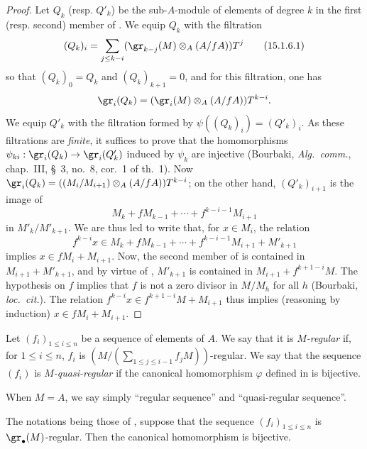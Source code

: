 \begin{proof}
Let $Q_k$ (resp. $Q'_k$) be the sub-$A$-module of elements of degree $k$ in the first (resp. second) member of .
We equip $Q_k$ with the filtration
\[
\label{0.15.1.6.1}
  (Q_k)_i = \sum_{j\leq k-i} (\gr_{k-j}(M)\otimes_A(A/fA))T^j
\tag{15.1.6.1}
\]
so that $(Q_k)_0=Q_k$ and $(Q_k)_{k+1}=0$, and for this filtration, one has
\[
  \gr_i(Q_k) = (\gr_i(M)\otimes_A(A/fA))T^{k-i}.
\]
We equip $Q'_k$ with the filtration formed by $\psi((Q_k)_i)=(Q'_k)_i$.
As these filtrations are \emph{finite}, it suffices to prove that the homomorphisms $\psi_{ki}:\gr_i(Q_k)\to\gr_i(Q'_k)$ induced by $\psi_k$ are injective
(Bourbaki, \emph{Alg.~comm.}, chap.~III, \S~3, no.~8, cor.~1 of th.~1).
Now $\gr_i(Q_k)=((M_i/M_{i+1})\otimes_A(A/fA))T^{k-i}$;
on the other hand, $(Q'_k)_{i+1}$ is the image of
\[
  M_k+fM_{k-1}+\cdots+f^{k-i-1}M_{i+1}
\]
in $M'_k/M'_{k+1}$.
We are thus led to write that, for $x\in M_i$, the relation
\[
\label{0.15.1.6.2}
  f^{k-i}x\in M_k+fM_{k-1}+\cdots+f^{k-i-1}M_{i+1}+M'_{k+1}
\tag{15.1.6.2}
\]
implies $x\in fM_i+M_{i+1}$.
Now, the second member of  is contained in $M_{i+1}+M'_{k+1}$, and by virtue of , $M'_{k+1}$ is contained in $M_{i+1}+f^{k+1-i}M$.
The hypothesis on $f$ implies that $f$ is not a zero divisor in $M/M_h$ for all $h$
(Bourbaki, \emph{loc.~cit.}).
The relation $f^{k-i}x\in f^{k+1-i}M+M_{i+1}$ thus implies (reasoning by induction) $x\in fM_i+M_{i+1}$.
\end{proof}

\begin{definition}[15.1.7]
\label{0.15.1.7}
Let $(f_i)_{1\leq i\leq n}$ be a sequence of elements of $A$.
We say that it is \emph{$M$-regular} if, for $1\leq i\leq n$, $f_i$ is $(M/(\sum_{1\leq j\leq i-1}f_jM))$-regular.
We say that the sequence $(f_i)$ is \emph{$M$-quasi-regular} if the canonical homomorphism $\varphi$ defined in  is bijective.

When $M=A$, we say simply ``regular sequence'' and ``quasi-regular sequence''.
\end{definition}

\begin{proposition}[15.1.8]
\label{0.15.1.8}
The notations being those of , suppose that the sequence $(f_i)_{1\leq i\leq n}$ is $\gr_\bullet(M)$-regular.
Then the canonical homomorphism  is bijective.
\end{proposition}

